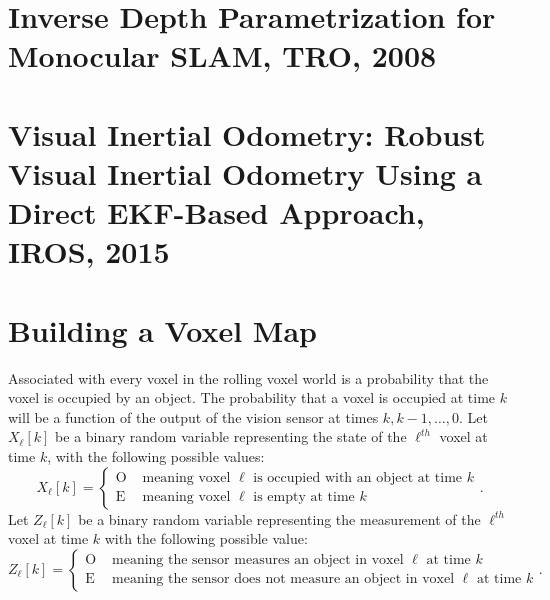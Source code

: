 \clearpage
\section{Inverse Depth Parametrization for Monocular SLAM, TRO, 2008}


\clearpage
\section{Visual Inertial Odometry:  Robust Visual Inertial Odometry Using a Direct EKF-Based Approach, IROS, 2015}


\section{Building a Voxel Map}
\label{sec:voxel_map_updates}


Associated with every voxel in the rolling voxel world is a probability that the voxel is occupied by an object.  The probability that a voxel is occupied at time $k$ will be a function of the output of the vision sensor at times $k, k-1, \dots, 0$.  Let $X_\ell[k]$ be a binary random variable representing the state of the $\ell^{th}$ voxel at time $k$, with the following possible values:
\[
X_\ell[k] = \begin{cases}
	\text{O} & \text{~meaning voxel $\ell$ is occupied with an object at time $k$} \\
	\text{E} & \text{~meaning voxel $\ell$ is empty at time $k$}
\end{cases}. 
\]
Let $Z_{\ell}[k]$ be a binary random variable representing the measurement of the $\ell^{th}$ voxel at time $k$ with the following possible value:
\[
Z_\ell[k] = \begin{cases}
\text{O} & \text{~meaning the sensor measures an object in voxel $\ell$ at time $k$} \\
\text{E} & \text{~meaning the sensor does not measure an object in voxel $\ell$ at time $k$}
\end{cases}.
\]

